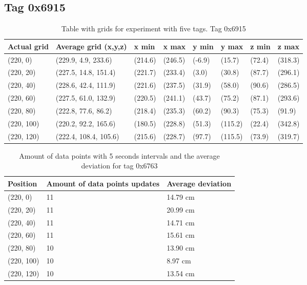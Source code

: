 \subsection{Tag 0x6915}
\begin{table}[H]
    \centering
    \begin{tabular}{|l|l|l|l|l|l|l|l|}
        \hline
        Actual grid & Average grid (x,y,z)  & x min   & x max   & y min  & y max   & z min  & z max   \\ \hline
        (220, 0)    & (229.9, 4.9, 233.6)   & (214.6) & (246.5) & (-6.9) & (15.7)  & (72.4) & (318.3) \\ \hline
        (220, 20)   & (227.5, 14.8, 151.4)  & (221.7) & (233.4) & (3.0)  & (30.8)  & (87.7) & (296.1) \\ \hline
        (220, 40)   & (228.6, 42.4, 111.9)  & (221.6) & (237.5) & (31.9) & (58.0)  & (90.6) & (286.5) \\ \hline
        (220, 60)   & (227.5, 61.0, 132.9)  & (220.5) & (241.1) & (43.7) & (75.2)  & (87.1) & (293.6) \\ \hline
        (220, 80)   & (222.8, 77.6, 86.2)   & (218.4) & (235.3) & (60.2) & (90.3)  & (75.3) & (91.9)  \\ \hline
        (220, 100)  & (220.2, 92.2, 165.6)  & (180.5) & (228.8) & (51.3) & (115.2) & (22.4) & (342.8) \\ \hline
        (220, 120)  & (222.4, 108.4, 105.6) & (215.6) & (228.7) & (97.7) & (115.5) & (73.9) & (319.7) \\ \hline
    \end{tabular}
    \caption{Table with grids for experiment with five tags. Tag 0x6915}
\end{table}

\begin{table}[H]
    \centering
    \begin{tabular}{|l|l|l|}
        \hline
        Position   & Amount of data points updates & Average deviation \\ \hline
        (220, 0)   & 11                            & 14.79 cm          \\ \hline
        (220, 20)  & 11                            & 20.99 cm          \\ \hline
        (220, 40)  & 11                            & 14.71 cm          \\ \hline
        (220, 60)  & 11                            & 15.61 cm          \\ \hline
        (220, 80)  & 10                            & 13.90 cm          \\ \hline
        (220, 100) & 10                            & 8.97 cm           \\ \hline
        (220, 120) & 10                            & 13.54 cm          \\ \hline
    \end{tabular}
    \caption{Amount of data points with 5 seconds intervals and the average deviation for tag 0x6763}
\end{table}

